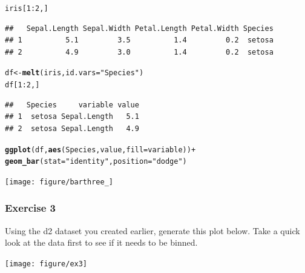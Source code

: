 \documentclass{beamer}\usepackage[]{graphicx}\usepackage[]{color}
\makeatletter
\newcommand{\hlstr}[1]{\textcolor[rgb]{0.192,0.494,0.8}{#1}}%
\newcommand{\hlkwd}[1]{\textcolor[rgb]{0.737,0.353,0.396}{\textbf{#1}}}%
\newenvironment{kframe}{%
 \def\at@end@of@kframe{}%
 \ifinner\ifhmode%
  \def\at@end@of@kframe{\end{minipage}}%
  \begin{minipage}{\columnwidth}%
 \fi\fi%
 \def\FrameCommand##1{\hskip\@totalleftmargin \hskip-\fboxsep
 \colorbox{shadecolor}{##1}\hskip-\fboxsep
     \hskip-\linewidth \hskip-\@totalleftmargin \hskip\columnwidth}%
 \MakeFramed {\advance\hsize-\width
   \@totalleftmargin\z@ \linewidth\hsize
   \@setminipage}}%
 {\par\unskip\endMakeFramed%
 \at@end@of@kframe}
\newenvironment{knitrout}{}{} %
\makeatother
\begin{document}

\begin{frame}[fragile]
\begin{knitrout}\footnotesize
{}\color{fgcolor}\begin{kframe}
\begin{alltt}
iris[1:2, ]
\end{alltt}
\begin{verbatim}
##   Sepal.Length Sepal.Width Petal.Length Petal.Width Species
## 1          5.1         3.5          1.4         0.2  setosa
## 2          4.9         3.0          1.4         0.2  setosa
\end{verbatim}
\begin{alltt}
df  <- \hlkwd{melt}(iris, id.vars = \hlstr{"Species"})
df[1:2, ]
\end{alltt}
\begin{verbatim}
##   Species     variable value
## 1  setosa Sepal.Length   5.1
## 2  setosa Sepal.Length   4.9
\end{verbatim}
\end{kframe}
\end{knitrout}

\end{frame}


\begin{frame}[fragile]
\begin{knitrout}\footnotesize
{}\color{fgcolor}\begin{kframe}
\begin{alltt}
\hlkwd{ggplot}(df, \hlkwd{aes}(Species, value, fill = variable)) +
\hlkwd{geom_bar}(stat = \hlstr{"identity"}, position = \hlstr{"dodge"})
\end{alltt}
\end{kframe}

{\centering \texttt{[image: figure/barthree\_]} 

}



\end{knitrout}

\end{frame}


\begin{frame}[fragile]
\frametitle{Exercise 3}
Using the d2 dataset you created earlier, generate this plot below. Take a quick look at the data first to see if it needs to be binned.
\begin{knitrout}\footnotesize
{}\color{fgcolor}

{\centering \texttt{[image: figure/ex3]} 

}



\end{knitrout}

\end{frame}
\end{document}
